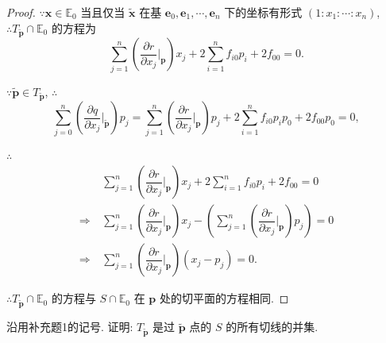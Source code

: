 \documentclass{ctexart}
\begin{document}
\begin{proof}
    $\because\boldsymbol{x}\in\mathbb{E}_0$ 当且仅当 $\tilde{\boldsymbol{x}}$ 在基 $\boldsymbol{e}_0,\boldsymbol{e}_1,\cdots,\boldsymbol{e}_n$ 下的坐标有形式 $(1:x_1:\cdots:x_n)$, $\therefore T_{\tilde{\boldsymbol{p}}}\cap\mathbb{E}_0$ 的方程为
    \[\sum\limits_{j=1}^n\left(\dfrac{\partial r}{\partial x_j}\bigg|_{\boldsymbol{p}}\right)x_j+2\sum\limits_{i=1}^nf_{i0}p_i+2f_{00}=0.\]

    $\because\tilde{\boldsymbol{p}}\in T_{\tilde{\boldsymbol{p}}}$, $\therefore$
    \[\sum\limits_{j=0}^n\left(\dfrac{\partial q}{\partial x_j}\bigg|_{\tilde{\boldsymbol{p}}}\right)p_j=\sum\limits_{j=1}^n\left(\dfrac{\partial r}{\partial x_j}\bigg|_{\boldsymbol{p}}\right)p_j+2\sum\limits_{i=1}^nf_{i0}p_ip_0+2f_{00}p_0=0,\]

    $\therefore$
    \begin{align*}
        & \sum\limits_{j=1}^n\left(\dfrac{\partial r}{\partial x_j}\bigg|_{\boldsymbol{p}}\right)x_j+2\sum\limits_{i=1}^nf_{i0}p_i+2f_{00}=0 \\
        \Rightarrow\ & \sum\limits_{j=1}^n\left(\dfrac{\partial r}{\partial x_j}\bigg|_{\boldsymbol{p}}\right)x_j-\left(\sum\limits_{j=1}^n\left(\dfrac{\partial r}{\partial x_j}\bigg|_{\boldsymbol{p}}\right)p_j\right)=0 \\
        \Rightarrow\ & \sum\limits_{j=1}^n\left(\dfrac{\partial r}{\partial x_j}\bigg|_{\boldsymbol{p}}\right)(x_j-p_j)=0.
    \end{align*}

    $\therefore T_{\tilde{\boldsymbol{p}}}\cap\mathbb{E}_0$ 的方程与 $S\cap\mathbb{E}_0$ 在 $\boldsymbol{p}$ 处的切平面的方程相同.
\end{proof}
\begin{exercisec}%
    沿用补充题1的记号. 证明: $T_{\tilde{\boldsymbol{p}}}$ 是过 $\tilde{\boldsymbol{p}}$ 点的 $S$ 的所有切线的并集.
\end{exercisec}
\end{document}
